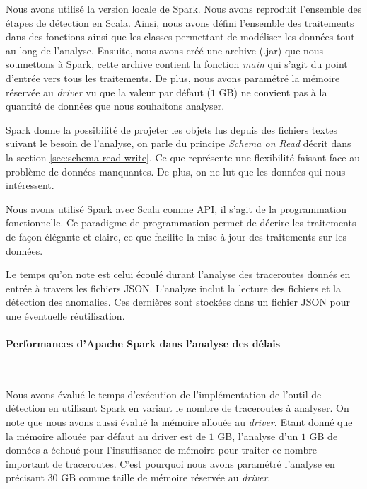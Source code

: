 Nous avons utilisé la version locale de Spark. Nous avons reproduit l'ensemble des étapes de détection en Scala. Ainsi,  nous avons défini l'ensemble des traitements dans des fonctions ainsi que les classes permettant de modéliser les données tout au long de l'analyse. Ensuite, nous avons créé une archive (.jar) que nous soumettons à Spark, cette archive contient la fonction \textit{main} qui s'agit du point d'entrée vers tous les traitements. De plus, nous avons paramétré la mémoire  réservée au \textit{driver} vu que la valeur par défaut ($1$ GB) ne convient pas à la quantité de données que nous souhaitons analyser.


Spark donne la possibilité  de projeter les objets lus  depuis des  fichiers textes suivant le besoin de l'analyse, on parle du principe \textit{ Schema on Read} décrit dans la section \ref{sec:schema-read-write}. Ce que représente une flexibilité faisant face au problème de données manquantes.  De plus, on ne lut que les données qui nous intéressent. 
 

Nous avons utilisé Spark avec Scala comme API, il s'agit de la programmation fonctionnelle. Ce paradigme de programmation permet de décrire les traitements de façon élégante et claire, ce que facilite la mise à jour des traitements sur les données. 

  
Le temps qu'on note est celui écoulé durant l'analyse des traceroutes donnés en entrée à travers les fichiers JSON. L'analyse inclut la lecture des fichiers et la détection des anomalies. Ces dernières sont stockées dans un fichier JSON pour une éventuelle réutilisation.



 

\paragraph{Performances d'Apache Spark dans l'analyse des délais }~

Nous avons évalué le temps d'exécution de l'implémentation de l'outil de détection en utilisant Spark en variant le nombre de traceroutes à analyser. On note que nous avons aussi évalué la mémoire allouée au \textit{driver}. Etant donné que la mémoire allouée par défaut au driver est de $1$ GB, l'analyse  d'un $1$ GB de données  a échoué pour l'insuffisance de mémoire pour traiter ce nombre important de traceroutes. C'est pourquoi nous avons paramétré l'analyse en précisant $30$ GB comme taille de mémoire réservée au \textit{driver}.


